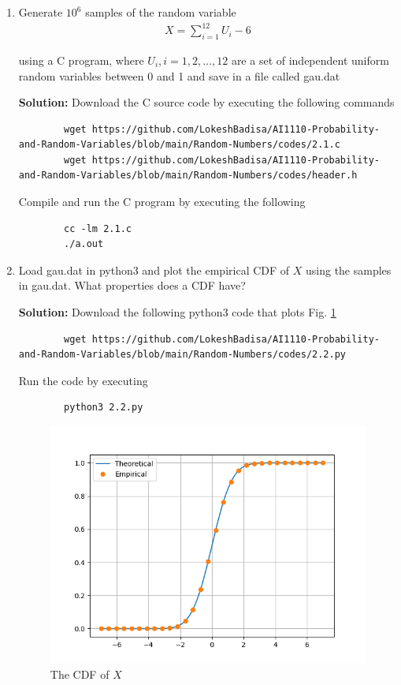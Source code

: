 \documentclass[journal,12pt,twocolumn]{IEEEtran}
\newcommand{\solution}{\noindent \textbf{Solution: }}
\numberwithin{equation}{section}
\renewcommand\thesection{\arabic{section}}
\begin{document}
	\begin{enumerate}[label=\thesection.\arabic*,ref=\thesection.\theenumi]
	\item Generate $10^6$ samples of the random variable
	\begin{align}
		X = \sum_{i=1}^{12}U_i -6
	\end{align}

	using a C program, where $U_i, i = 1,2,\dots, 12$ are  a set of independent uniform random variables between 0 and 1 and save in a file called gau.dat
	
	\solution Download the C source code by executing the following commands
	\begin{lstlisting}
		wget https://github.com/LokeshBadisa/AI1110-Probability-and-Random-Variables/blob/main/Random-Numbers/codes/2.1.c
		wget https://github.com/LokeshBadisa/AI1110-Probability-and-Random-Variables/blob/main/Random-Numbers/codes/header.h
	\end{lstlisting}
	Compile and run the C program by executing the following
	\begin{lstlisting}
		cc -lm 2.1.c
		./a.out
	\end{lstlisting}
		
	\item Load gau.dat in python3 and plot the empirical CDF of $X$ using the samples in gau.dat. What properties does a CDF have?

	\solution Download the following python3 code that plots Fig. \ref{fig-2.2}
	\begin{lstlisting}
		wget https://github.com/LokeshBadisa/AI1110-Probability-and-Random-Variables/blob/main/Random-Numbers/codes/2.2.py
	\end{lstlisting}
	Run the code by executing
	\begin{lstlisting}
		python3 2.2.py
	\end{lstlisting}
	\begin{figure}
		\centering
		\includegraphics[width=\columnwidth]{./figs/2.2.png}
		\caption{The CDF of $X$}
		\label{fig-2.2}
	\end{figure}
	

\end{enumerate}
\end{document}

